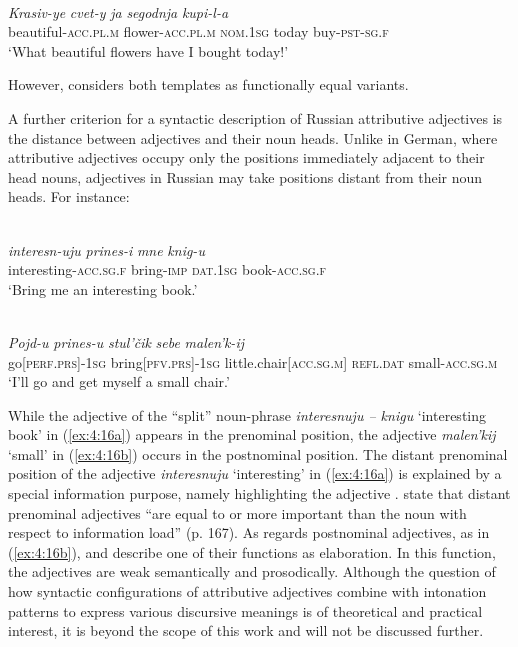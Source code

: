 \ea
\label{ex:4:15}
\citep[153]{zemskaja}\\
\gll \textit{Krasiv-ye} \textit{cvet-y} \textit{ja} \textit{segodnja} \textit{kupi-l-a}\\
	beautiful-\textsc{acc.pl.m} flower-\textsc{acc.pl.m} \textsc{nom.1sg} today buy-\textsc{pst-sg.f}\\
\glt `What beautiful flowers have I bought today!'
\z

\noindent However, \citet[208, 211, 221-222]{lapteva} considers both templates as functionally equal variants.

A further criterion for a syntactic description of Russian attributive adjectives is the distance between adjectives and their noun heads. Unlike in German, where attributive adjectives occupy only the positions immediately adjacent to their head nouns, adjectives in Russian may take positions distant from their noun heads. For instance:

\ea
\ea{\label{ex:4:16a}}
\citep[165]{miller-weinert}\\
\gll \textit{interesn-uju} \textit{prines-i} \textit{mne} \textit{knig-u}\\
	interesting-\textsc{acc.sg.f} bring-\textsc{imp} \textsc{dat.1sg} book-\textsc{acc.sg.f}\\
\glt `Bring me an interesting book.'

\ex
\label{ex:4:16b}
\citep[213]{lapteva}\\
\gll \textit{Pojd-u} \textit{prines-u} \textit{stul'čik} \textit{sebe} \textit{malen'k-ij}\\
	go[\textsc{perf.prs}]-\textsc{1sg} bring[\textsc{pfv.prs}]-\textsc{1sg} little.chair[\textsc{acc.sg.m}] \textsc{refl.dat} small-\textsc{acc.sg.m}\\
\glt `I'll go and get myself a small chair.'
\z
\z

\noindent While the adjective of the “split” noun-phrase \textit{interesnuju -- knigu} `interesting book' in (\ref{ex:4:16a}) appears in the prenominal position, the adjective \textit{malen'kij} `small' in (\ref{ex:4:16b}) occurs in the postnominal position. The distant prenominal position of the adjective \textit{interesnuju} `interesting' in (\ref{ex:4:16a}) is explained by a special information purpose, namely highlighting the adjective \citep[153]{zemskaja}. \citet{miller-weinert} state that distant prenominal adjectives ``are equal to or more important than the noun with respect to information load'' (p. 167). As regards postnominal adjectives, as in (\ref{ex:4:16b}), \citet[213]{lapteva}  and \citet[153]{zemskaja} describe one of their functions as elaboration. In this function, the adjectives are weak semantically and prosodically. Although the question of how syntactic configurations of attributive adjectives combine with intonation patterns to express various discursive meanings is of theoretical and practical interest, it is beyond the scope of this work and will not be discussed further.

